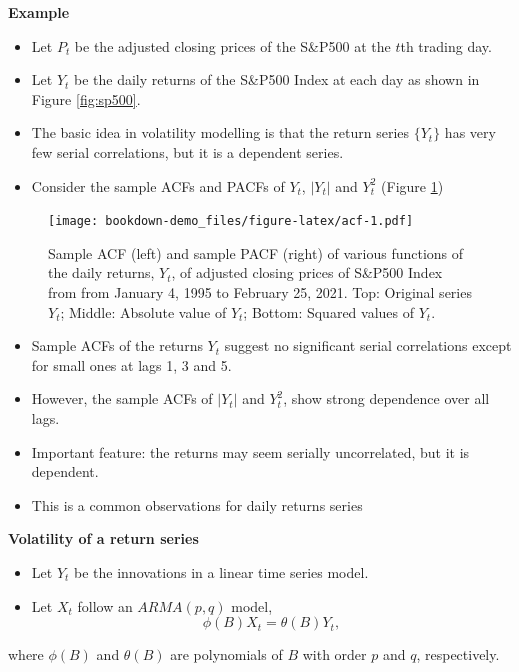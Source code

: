 \documentclass[]{book}
\providecommand{\tightlist}{%
  \setlength{\itemsep}{0pt}\setlength{\parskip}{0pt}}
\begin{document}
\textbf{Example}

\begin{itemize}
\tightlist
\item
  Let \(P_t\) be the adjusted closing prices of the S\&P500 at the \(t\)th trading day.
\item
  Let \(Y_t\) be the daily returns of the S\&P500 Index at each day as shown in Figure \ref{fig:sp500}.
\item
  The basic idea in volatility modelling is that the return series \(\{Y_t\}\) has very few serial correlations, but it is a dependent series.
\item
  Consider the sample ACFs and PACFs of \(Y_t\), \(|Y_t|\) and \(Y_t^2\) (Figure \ref{fig:acf})
\end{itemize}

\begin{figure}
\centering
\texttt{[image: bookdown-demo\_files/figure-latex/acf-1.pdf]}
\caption{\label{fig:acf}Sample ACF (left) and sample PACF (right) of various functions of the daily returns, \(Y_t\), of adjusted closing prices of S\&P500 Index from from January 4, 1995 to February 25, 2021. Top: Original series \(Y_t\); Middle: Absolute value of \(Y_t\); Bottom: Squared values of \(Y_t\).}
\end{figure}

\begin{itemize}
\tightlist
\item
  Sample ACFs of the returns \(Y_t\) suggest no significant serial correlations except for small ones at lags 1, 3 and 5.
\item
  However, the sample ACFs of \(|Y_t|\) and \(Y_t^2\), show strong dependence over all lags.
\item
  Important feature: the returns may seem serially uncorrelated, but it is dependent.
\item
  This is a common observations for daily returns series
\end{itemize}

\textbf{Volatility of a return series}

\begin{itemize}
\tightlist
\item
  Let \(Y_t\) be the innovations in a linear time series model.
\item
  Let \(X_t\) follow an \(ARMA(p,q)\) model,
  \[\phi(B)X_t=\theta(B)Y_t,\]
\end{itemize}

where \(\phi(B)\) and \(\theta(B)\) are polynomials of \(B\) with order \(p\) and \(q\), respectively.
\end{document}
